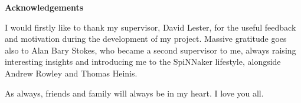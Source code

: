 \vspace*{1.5cm}
{ \huge \bfseries Acknowledgements}
\vspace{7mm}

I would firstly like to thank my supervisor, David Lester, for the useful feedback and motivation during the development of my project. Massive gratitude goes also to Alan Bary Stokes, who became a second supervisor to me, always raising interesting insights and introducing me to the SpiNNaker lifestyle, alongside Andrew Rowley and Thomas Heinis.

As always, friends and family will always be in my heart. I love you all.